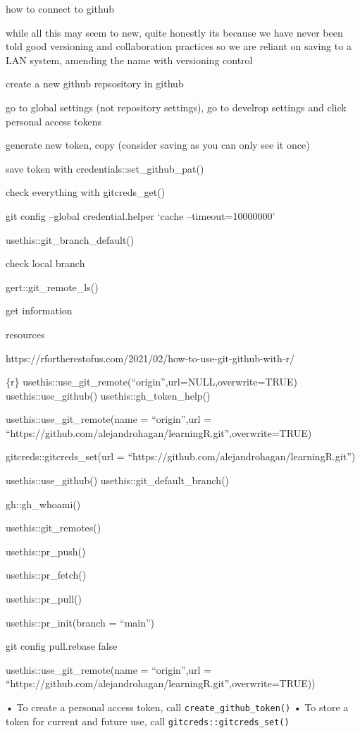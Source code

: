 \documentclass[
  letterpaper,
  DIV=11,
  numbers=noendperiod]{scrreprt}
\begin{document}
how to connect to github

while all this may seem to new, quite honestly its because we have never
been told good versioning and collaboration practices so we are reliant
on saving to a LAN system, amending the name with versioning control

create a new github repsository in github

go to global settings (not repository settings), go to develrop settings
and click personal access tokens

generate new token, copy (consider saving as you can only see it once)

save token with credentials::set\_github\_pat()

check everything with gitcreds\_get()

git config --global credential.helper `cache --timeout=10000000'

usethis::git\_branch\_default()

check local branch

gert::git\_remote\_ls()

get information

resources

https://rfortherestofus.com/2021/02/how-to-use-git-github-with-r/

\{r\} usethis::use\_git\_remote(``origin'',url=NULL,overwrite=TRUE)
usethis::use\_github() usethis::gh\_token\_help()

usethis::use\_git\_remote(name = ``origin'',url =
``https://github.com/alejandrohagan/learningR.git'',overwrite=TRUE)

gitcreds::gitcreds\_set(url =
``https://github.com/alejandrohagan/learningR.git'')

usethis::use\_github() usethis::git\_default\_branch()

gh::gh\_whoami()

usethis::git\_remotes()

usethis::pr\_push()

usethis::pr\_fetch()

usethis::pr\_pull()

usethis::pr\_init(branch = ``main'')

git config pull.rebase false

usethis::use\_git\_remote(name = ``origin'',url =
``https://github.com/alejandrohagan/learningR.git'',overwrite=TRUE))

• To create a personal access token, call
\texttt{create\_github\_token()} • To store a token for current and
future use, call \texttt{gitcreds::gitcreds\_set()}
\end{document}
